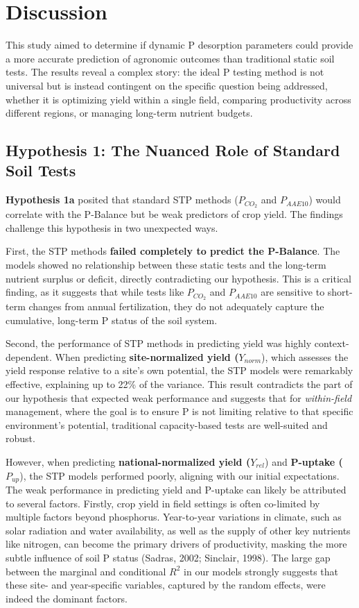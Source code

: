 \documentclass[
  a4paper,
]{article}
\begin{document}
\section{Discussion}\label{discussion}

This study aimed to determine if dynamic P desorption parameters could
provide a more accurate prediction of agronomic outcomes than
traditional static soil tests. The results reveal a complex story: the
ideal P testing method is not universal but is instead contingent on the
specific question being addressed, whether it is optimizing yield within
a single field, comparing productivity across different regions, or
managing long-term nutrient budgets.

\subsection{Hypothesis 1: The Nuanced Role of Standard Soil
Tests}\label{hypothesis-1-the-nuanced-role-of-standard-soil-tests}

\textbf{Hypothesis 1a} posited that standard STP methods (\(P_{CO_2}\)
and \(P_{AAE10}\)) would correlate with the P-Balance but be weak
predictors of crop yield. The findings challenge this hypothesis in two
unexpected ways.

First, the STP methods \textbf{failed completely to predict the
P-Balance}. The models showed no relationship between these static tests
and the long-term nutrient surplus or deficit, directly contradicting
our hypothesis. This is a critical finding, as it suggests that while
tests like \(P_{CO_2}\) and \(P_{AAE10}\) are sensitive to short-term
changes from annual fertilization, they do not adequately capture the
cumulative, long-term P status of the soil system.

Second, the performance of STP methods in predicting yield was highly
context-dependent. When predicting \textbf{site-normalized yield
(}\(Y_{norm}\)), which assesses the yield response relative to a site's
own potential, the STP models were remarkably effective, explaining up
to 22\% of the variance. This result contradicts the part of our
hypothesis that expected weak performance and suggests that for
\emph{within-field} management, where the goal is to ensure P is not
limiting relative to that specific environment's potential, traditional
capacity-based tests are well-suited and robust.

However, when predicting \textbf{national-normalized yield
(}\(Y_{rel}\)) and \textbf{P-uptake (}\(P_{up}\)), the STP models
performed poorly, aligning with our initial expectations. The weak
performance in predicting yield and P-uptake can likely be attributed to
several factors. Firstly, crop yield in field settings is often
co-limited by multiple factors beyond phosphorus. Year-to-year
variations in climate, such as solar radiation and water availability,
as well as the supply of other key nutrients like nitrogen, can become
the primary drivers of productivity, masking the more subtle influence
of soil P status (Sadras, 2002; Sinclair, 1998). The large gap between
the marginal and conditional \(R^2\) in our models strongly suggests
that these site- and year-specific variables, captured by the random
effects, were indeed the dominant factors.
\end{document}
